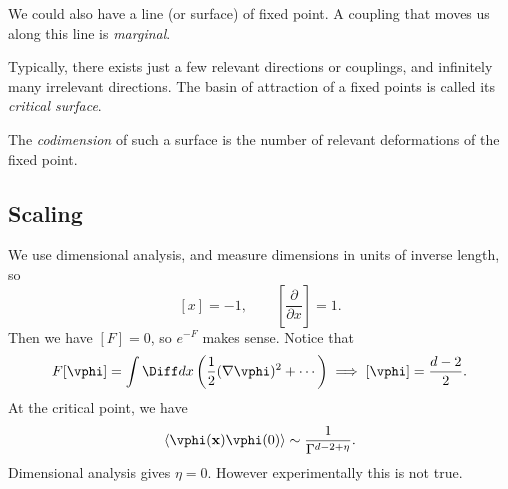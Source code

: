 \documentclass[12pt]{article}
\begin{document}
We could also have a line (or surface) of fixed point. A coupling that moves us along this line is \emph{marginal}.

Typically, there exists just a few relevant directions or couplings, and infinitely many irrelevant directions. The basin of attraction of a fixed points is called its \emph{critical surface}.

The \emph{codimension} of such a surface is the number of relevant deformations of the fixed point.

\subsection{Scaling}%
\label{sub:sc}

We use dimensional analysis, and measure dimensions in units of inverse length, so
\[
	[x] = -1, \qquad \left[ \frac{\partial}{\partial x} \right] = 1.
\]
Then we have $[F] = 0$, so $e^{-F}$ makes sense. Notice that
\[
	F[\vphi] = \int \Diff dx \left( \frac{1}{2} (\nabla \vphi)^2 + \cdots \right) \implies [\vphi] = \frac{d - 2}{2}.
\]
At the critical point, we have
\[
\langle \vphi(\mathbf{x})  \vphi(0) \rangle \sim \frac{1}{\Gamma^{d-2+\eta}}.
\]
Dimensional analysis gives $\eta = 0$. However experimentally this is not true.
\end{document}
